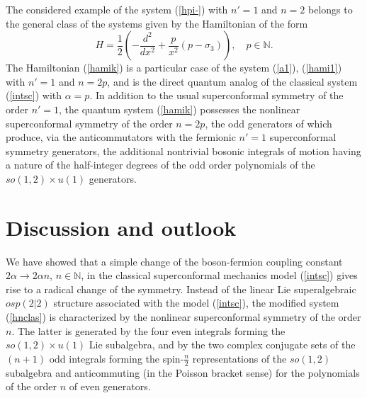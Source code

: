 \documentclass[a4paper,12pt]{article}
\def\N{\mathbb N}
\begin{document}
The considered example of the system (\ref{hpi-})
with $n'=1$ and $n=2$ belongs to the general class of the
systems given by the Hamiltonian of the form
\begin{equation}
H=\frac{1}{2}\left(-\frac{d^2}{dx^2}+\frac{p}
{x^2}(p- \sigma_3)\right),\quad
p\in \N.
\label{hamik}
\end{equation}
The Hamiltonian (\ref{hamik}) is a particular case
of the system (\ref{a1}), (\ref{hami1})
with $n'=1$ and $n=2p$,
and is the direct quantum analog
of the classical system (\ref{intsc})
with $\alpha=p$.
In addition
to the usual superconformal symmetry
of the order $n'=1$, the quantum system
(\ref{hamik}) possesses the nonlinear
superconformal symmetry of the order $n=2p$,
the odd generators of which produce,
via the anticommutators with the
fermionic $n'=1$ superconformal symmetry generators,
the additional nontrivial
bosonic integrals of motion having a
nature of the half-integer degrees
of the
odd order polynomials
of the
$so(1,2)\times u(1)$ generators.


\section{Discussion and outlook}

We have showed that a simple change
of the boson-fermion coupling
constant
$2\alpha\rightarrow 2\alpha n$,
$n\in \N$, in  the
classical superconformal mechanics
model (\ref{intsc})
gives rise to a radical change of the symmetry.
Instead of the linear Lie superalgebraic $osp(2|2)$
structure associated with the model
(\ref{intsc}), the modified system
(\ref{hnclas}) is characterized by
the nonlinear superconformal symmetry of
the order $n$.
The latter is generated
by the four even integrals forming the
$so(1,2)\times u(1)$ Lie subalgebra,
and by the two complex conjugate
sets of the $(n+1)$ odd integrals forming the
spin-$\frac{n}{2}$
representations of the $so(1,2)$ subalgebra and
anticommuting (in the Poisson bracket sense)
for the polynomials of the order $n$ of even generators.
\end{document}
